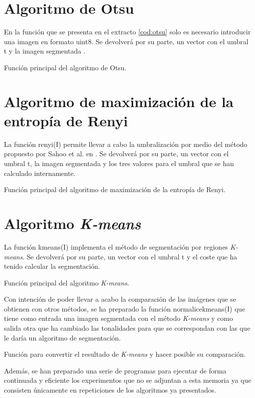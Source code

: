 \documentclass[main]{subfiles}
\begin{document}
\section{Algoritmo de Otsu}
En la función que se presenta en el extracto \ref{cod:otsu} solo es necesario introducir una imagen en formato {\ttfamily uint8}. Se devolverá por su parte, un vector con el umbral {\ttfamily t} y la imagen segmentada \cite{art:otsu}.
\begin{listing}
    \caption{Función principal del algoritmo de Otsu.\label{cod:otsu}}
\end{listing}


\section{Algoritmo de maximización de la entropía de Renyi}
La función {\ttfamily renyi(I)} permite llevar a cabo la umbralización por medio del método propuesto por Sahoo et al. en \cite{art:sahoo}. Se devolverá por su parte, un vector con el umbral {\ttfamily t}, la imagen segmentada y los tres valores para el umbral que se han calculado internamente.
\begin{listing}
    \caption{Función principal del algoritmo de maximización de la entropía de Renyi.\label{cod:renyi}}
\end{listing}


\section{Algoritmo {\em K-means}}
La función {\ttfamily kmeans(I)} implementa el método de segmentación por regiones {\em K-means}. Se devolverá por su parte, un vector con el umbral {\ttfamily t} y el coste que ha tenido calcular la segmentación.
\begin{listing}
    \caption{Función principal del algoritmo {\em K-means}.\label{cod:kmeans}}
\end{listing}

Con intención de poder llevar a acabo la comparación de las imágenes que se obtienen con otros métodos, se ha preparado la función {\ttfamily normalicekmeans(I)} que tiene como entrada una imagen segmentada con el método {\em K-means} y como salida otra que ha cambiado las tonalidades para que se correspondan con las que le daría un algoritmo de segmentación.
\begin{listing}
    \caption{Función para convertir el resultado de {\em K-means} y hacer posible su comparación.\label{cod:kmeansnormalice}}
\end{listing}

Además, se han preparado una serie de programas para ejecutar de forma continuada y eficiente los experimentos que no se adjuntan a esta memoria ya que consisten únicamente en repeticiones de los algoritmos ya presentados.

\end{document}
